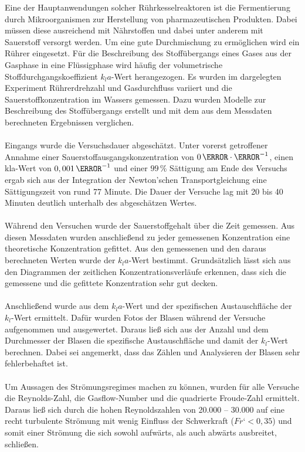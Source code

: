 \documentclass[12pt,liststotoc]{report}
\begin{document}
Eine der Hauptanwendungen solcher Rührkesselreaktoren ist die Fermentierung durch Mikroorganismen zur Herstellung von pharmazeutischen Produkten. Dabei müssen diese ausreichend mit Nährstoffen und dabei unter anderem mit Sauerstoff versorgt werden. Um eine gute Durchmischung zu ermöglichen wird ein Rührer eingesetzt. Für die Beschreibung des Stoffübergangs eines Gases aus der Gasphase in eine Flüssigphase wird häufig der volumetrische Stoffdurchgangskoeffizient $k_la$-Wert herangezogen. Es wurden im dargelegten Experiment Rührerdrehzahl und Gasdurchfluss variiert und die Sauerstoffkonzentration im Wassers gemessen. Dazu wurden Modelle zur Beschreibung des Stoffübergangs erstellt und mit dem aus dem Messdaten berechneten Ergebnissen verglichen.\\
\\
Eingangs wurde die Versuchsdauer abgeschätzt. Unter vorerst getroffener Annahme einer Sauerstoffausgangskonzentration von $0\,\mole\cdot \litre^{-1}$, einen kla-Wert von $0,001\,\s^{-1}$ und einer $99\,\%$ Sättigung am Ende des Versuchs ergab sich aus der Integration der Newton’schen Transportgleichung eine Sättigungszeit von rund 77 Minute. Die Dauer der Versuche lag mit 20 bis 40 Minuten deutlich unterhalb des abgeschätzen Wertes.\\
\\
Während den Versuchen wurde der Sauerstoffgehalt über die Zeit gemessen. Aus diesen Messdaten wurden anschließend zu jeder gemessenen Konzentration eine theoretische Konzentration gefittet. Aus den gemessenen und den daraus berechneten Werten wurde der $k_la$-Wert bestimmt. Grundsätzlich lässt sich aus den Diagrammen der zeitlichen Konzentrationsverläufe erkennen, dass sich die gemessene und die gefittete Konzentration sehr gut decken.\\
\\
Anschließend wurde aus dem $k_la$-Wert und der spezifischen Austauschfläche der $k_l$-Wert ermittelt. Dafür wurden Fotos der Blasen während der Versuche aufgenommen und ausgewertet. Daraus ließ sich aus der Anzahl und dem Durchmesser der Blasen die spezifische Austauschfläche und damit der $k_l$-Wert berechnen. Dabei sei angemerkt, dass das Zählen und Analysieren der Blasen sehr fehlerbehaftet ist.\\
\\
Um Aussagen des Strömungsregimes machen zu können, wurden für alle Versuche die Reynolds-Zahl, die Gasflow-Number und die quadrierte Froude-Zahl ermittelt. Daraus ließ sich durch die hohen Reynoldszahlen von 20.000 -- 30.000 auf eine recht turbulente Strömung mit wenig Einfluss der Schwerkraft ($Fr‘<0,35$) und somit einer Strömung die sich sowohl aufwärts, als auch abwärts ausbreitet, schließen.\\
\end{document}
